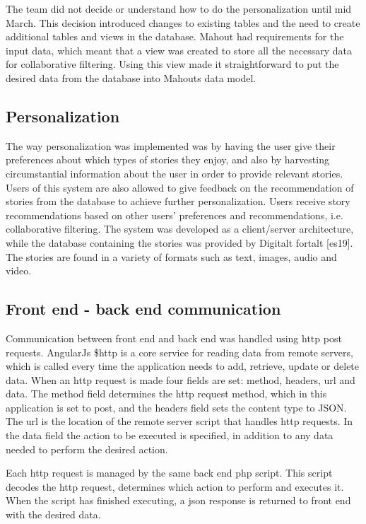 The team did not decide or understand how to do the personalization until mid March. This decision introduced changes to existing tables and the need to create additional tables and views in the database. Mahout had requirements for the input data, which meant that a view was created to store all the necessary data for collaborative filtering. Using this view made it straightforward to put the desired data from the database into Mahouts data model.

\subsection{Personalization}

The way personalization was implemented was by having the user give their preferences about which types of stories they enjoy, and also by harvesting circumstantial  information about the user in order to provide relevant stories. Users of this system are also allowed to give feedback on the recommendation of stories from the database to achieve further personalization.  Users receive story recommendations based on other users’ preferences and recommendations, i.e. collaborative filtering. The system was developed as a client/server architecture, while the database containing the stories was provided by Digitalt fortalt [es19]. The stories are found in a variety of formats such as text, images, audio and video.

\subsection{Front end - back end communication}

Communication between front end and back end was handled using http post requests.
AngularJs \$http is a core service for reading data from remote servers, which is called every time the application needs to add, retrieve, update or delete data. When an http request is made four fields are set: method, headers, url and data. The method field determines the http request method, which in this application is set to post, and the headers field sets the content type to JSON. The url is the location of the remote server script that handles http requests. In the data field the action to be executed is specified, in addition to any data needed to perform the desired action.\newline

Each http request is managed by the same back end php script. This script decodes the http request, determines which action to perform and executes it. When the script has finished executing, a json response is returned to front end with the desired data.

\cleardoublepage
